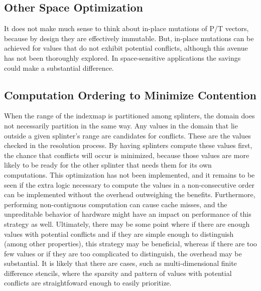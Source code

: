 \subsection{Other Space Optimization}
It does not make much sense to think about in-place mutations of P/T vectors,
because by design they are effectively immutable. But, in-place mutations can be
achieved for values that do not exhibit potential conflicts, although this
avenue has not been thoroughly explored. In space-sensitive applications the
savings could make a substantial difference.


\subsection{Computation Ordering to Minimize Contention}
When the range of the indexmap is partitioned among splinters, the domain does
not necessarily partition in the same way. Any values in the domain that lie
outside a given splinter's range are candidates for conflicts. These are the
values checked in the resolution process. By having splinters compute these
values first, the chance that conflicts will occur is minimized, because those
values are more likely to be ready for the other splinter that needs them for
its own computations. This optimization has not been implemented, and it remains
to be seen if the extra logic necessary to compute the values in a
non-consecutive order can be implemented without the overhead outweighing the
benefits. Furthermore, performing non-contiguous computation can cause cache
misses, and the unpreditable behavior of hardware might have an impact on
performance of this strategy as well. Ultimately, there may be some point where
if there are enough values with potential conflicts and if they are simple
enough to distinguish (among other properties), this strategy may be beneficial,
whereas if there are too few values or if they are too complicated to
distinguish, the overhead may be substantial. It is likely that there are cases,
such as multi-dimensional finite difference stencils, where the sparsity and
pattern of values with potential conflicts are straightfoward enough to easily
prioritize.

